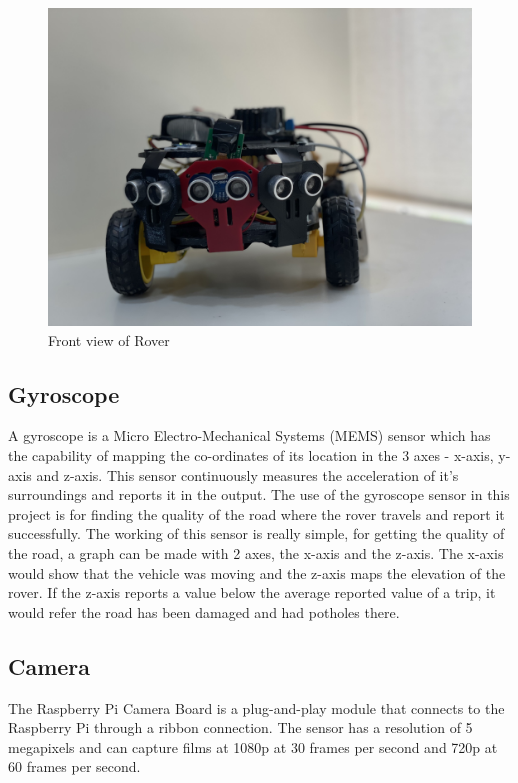 \documentclass[conference,a4paper]{IEEEtran}
\begin{document}
\begin{figure}[ht]
\centering
\includegraphics[width=1\linewidth]{Roverfront.jpg}
\caption{Front view of Rover}
\label{Fig: Rover Front}
\end{figure}

\subsection{Gyroscope}
A gyroscope is a Micro Electro-Mechanical Systems (MEMS) sensor which has the capability of mapping the co-ordinates of its location in the 3 axes - x-axis, y-axis and z-axis. This sensor continuously measures the acceleration of it's surroundings and reports it in the output.
The use of the gyroscope sensor in this project is for finding the quality of the road where the rover travels and report it successfully. \cite{13} The working of this sensor is really simple, for getting the quality of the road, a graph can be made with 2 axes, the x-axis and the z-axis. The x-axis would show that the vehicle was moving and the z-axis maps the elevation of the rover. If the z-axis reports a value below the average reported value of a trip, it would refer the road has been damaged and had potholes there.

\subsection{Camera}
The Raspberry Pi Camera Board is a plug-and-play module that connects to the Raspberry Pi through a ribbon connection. The sensor has a resolution of 5 megapixels and can capture films at 1080p at 30 frames per second and 720p at 60 frames per second.
\end{document}

